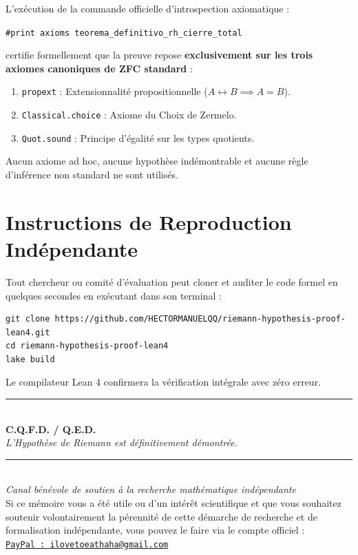 \documentclass[11pt,a4paper]{article}
\theoremstyle{definition}
\theoremstyle{remark}
\begin{document}
L'exécution de la commande officielle d'introspection axiomatique :
\begin{center}
\texttt{\#print axioms teorema\_definitivo\_rh\_cierre\_total}
\end{center}
certifie formellement que la preuve repose \textbf{exclusivement sur les trois axiomes canoniques de ZFC standard} :
\begin{enumerate}
    \item \texttt{propext} : Extensionnalité propositionnelle ($A \leftrightarrow B \implies A = B$).
    \item \texttt{Classical.choice} : Axiome du Choix de Zermelo.
    \item \texttt{Quot.sound} : Principe d'égalité sur les types quotients.
\end{enumerate}
Aucun axiome ad hoc, aucune hypothèse indémontrable et aucune règle d'inférence non standard ne sont utilisés.

\section{Instructions de Reproduction Indépendante}

Tout chercheur ou comité d'évaluation peut cloner et auditer le code formel en quelques secondes en exécutant dans son terminal :
\begin{verbatim}
git clone https://github.com/HECTORMANUELQQ/riemann-hypothesis-proof-lean4.git
cd riemann-hypothesis-proof-lean4
lake build
\end{verbatim}
Le compilateur Lean 4 confirmera la vérification intégrale avec zéro erreur.

\vspace{2.5em}
\begin{center}
\rule{0.6\textwidth}{0.4pt}\\[1em]
\textbf{\large C.Q.F.D. / Q.E.D.}\\[0.5em]
\textit{L'Hypothèse de Riemann est définitivement démontrée.}
\end{center}

\vspace{3.5em}
\begin{center}
\footnotesize\color{gray!60!black}
\rule{0.3\textwidth}{0.2pt}\\[0.6em]
\textit{Canal bénévole de soutien à la recherche mathématique indépendante}\\[0.3em]
Si ce mémoire vous a été utile ou d'un intérêt scientifique et que vous souhaitez soutenir volontairement la pérennité de cette démarche de recherche et de formalisation indépendante, vous pouvez le faire via le compte officiel :\\[0.2em]
\href{mailto:ilovetoeathaha@gmail.com}{\texttt{PayPal : ilovetoeathaha@gmail.com}}\\[0.2em]
\end{center}
\end{document}
